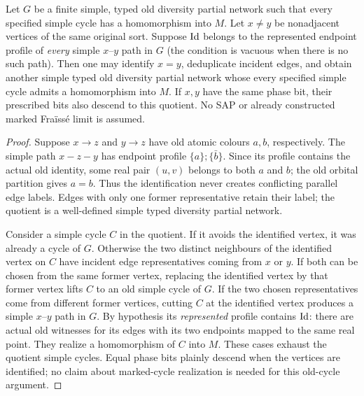\begin{lemma}
\label{lem:ep-ap-identity-fold}
Let \(G\) be a finite simple, typed old diversity partial network
such that every specified simple cycle has a homomorphism into \(M\).
Let \(x\ne y\) be nonadjacent vertices of the same original sort.
Suppose \(\mathrm{Id}\) belongs to the represented endpoint profile of
\emph{every} simple \(x\)--\(y\) path in \(G\)
(the condition is vacuous when there is no such path).
Then one may identify \(x=y\), deduplicate incident edges,
and obtain another simple typed old diversity partial network
whose every specified simple cycle admits a homomorphism into \(M\).
If \(x,y\) have the same phase bit, their prescribed bits
also descend to this quotient. No SAP or already constructed
marked Fra\"iss\'e limit is assumed.
\end{lemma}
\begin{proof}
Suppose \(x\to z\) and \(y\to z\) have old atomic colours
\(a,b\), respectively. The simple path \(x-z-y\)
has endpoint profile \(\{a\};\{\bar b\}\).
Since its profile contains the actual old identity, some
real pair \((u,v)\) belongs to both \(a\) and \(b\);
the old orbital partition gives \(a=b\).
Thus the identification never creates conflicting parallel
edge labels. Edges with only one former representative
retain their label; the quotient is a well-defined simple
typed diversity partial network.

Consider a simple cycle \(C\) in the quotient.
If it avoids the identified vertex, it was already a cycle
of \(G\). Otherwise the two distinct neighbours of the
identified vertex on \(C\) have incident edge representatives
coming from \(x\) or \(y\). If both can be chosen from the
same former vertex, replacing the identified vertex by that
former vertex lifts \(C\) to an old simple cycle of \(G\).
If the two chosen representatives come from different former
vertices, cutting \(C\) at the identified vertex produces a
simple \(x\)--\(y\) path in \(G\).
By hypothesis its \emph{represented} profile contains \(\mathrm{Id}\):
there are actual old witnesses for its edges with its two
endpoints mapped to the same real point. They realize a
homomorphism of \(C\) into \(M\).
These cases exhaust the quotient simple cycles.
Equal phase bits plainly descend when the vertices are
identified; no claim about marked-cycle realization is
needed for this old-cycle argument.
\end{proof}

